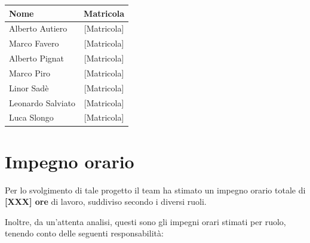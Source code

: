 \documentclass[a4paper,12pt]{article}
\begin{document}
\begin{center}
\begin{tcolorbox}[colback=lightgray,colframe=primaryblue,width=0.85\textwidth,arc=3mm,boxrule=0.5pt,title={\bfseries Il team BugBusters}]
\begin{center}
\begin{tabular}{lc}
\toprule
\textbf{Nome} & \textbf{Matricola} \\
\midrule
Alberto Autiero & {[Matricola]} \\
Marco Favero & {[Matricola]} \\
Alberto Pignat & {[Matricola]} \\
Marco Piro & {[Matricola]} \\
Linor Sadè & {[Matricola]} \\
Leonardo Salviato & {[Matricola]} \\
Luca Slongo & {[Matricola]} \\
\bottomrule
\end{tabular}
\end{center}
\end{tcolorbox}
\end{center}

\vspace{1cm}

\renewcommand{\cftsecpagefont}{\normalfont}
\renewcommand{\cftsecleader}{\cftdotfill{\cftsecdotsep}}
\setlength{\cftbeforesecskip}{2pt}
\begin{center}
\begin{tcolorbox}[colback=lightgray,colframe=darkgray,width=0.9\textwidth,arc=2mm,boxrule=0.5pt]
\tableofcontents
\end{tcolorbox}
\end{center}

\newpage

\section{Impegno orario}

Per lo svolgimento di tale progetto il team ha stimato un impegno orario totale di \textbf{[XXX] ore} di lavoro, suddiviso secondo i diversi ruoli.

Inoltre, da un'attenta analisi, questi sono gli impegni orari stimati per ruolo, tenendo conto delle seguenti responsabilità:

\vspace{0.5cm}
\end{document}
